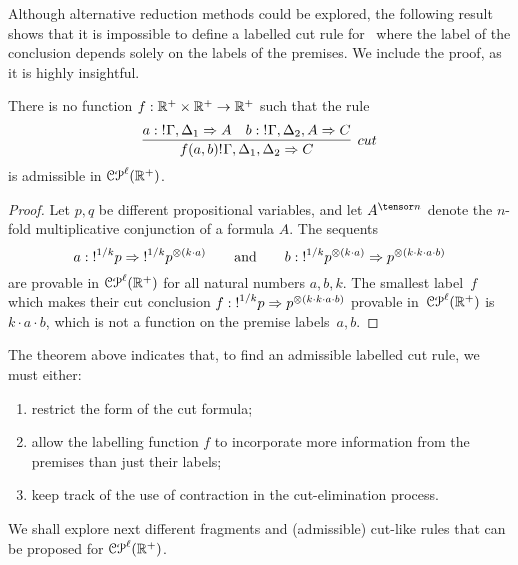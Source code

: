 Although alternative reduction methods could be explored, the following result shows that it is impossible to define a labelled cut rule for \laSELLR\ where the label of the conclusion depends solely on the labels of the premises. We include the  proof, as it is highly insightful.
\begin{theorem}\label{thm:impossible} There is no function $f:\mathbb{R}^+\times \mathbb{R}^+\rightarrow\mathbb{R}^+$ such that the rule
$$
\infer[cut]{f(a,b)\nbang{}\Gamma,\Delta_1,\Delta_2\seq C}
	{a: \nbang{}\Gamma,\Delta_1\seq A &
	b:\nbang{}\Gamma,\Delta_2,A\seq C
	}
$$
is admissible in $\mathcal{CP}^\ell(\mathbb{R}^{+})$.
\end{theorem}
\begin{proof}
Let $p,q$ be different propositional variables, and let $A^{\tensor n}$ denote the $n$-fold multiplicative conjunction of a formula $A$. The sequents
$$a:\hbox{$\mathop{!}^{1/k}$}p\Rightarrow\hbox{$\mathop{!}^{1/k}$}p^{\otimes (k\cdot a)}\qquad\text{and}\qquad b:\hbox{$\mathop{!}^{1/k}$}p^{\otimes (k\cdot a)}\Rightarrow p^{\otimes(k\cdot k\cdot a\cdot b)} 
$$
are provable in $\mathcal{CP}^\ell(\mathbb{R}^{+})$ for all natural numbers $a,b,k$. The smallest label~$f$ which makes their cut conclusion
$f: \hbox{$\mathop{!}^{1/k}$}p\Rightarrow p^{\otimes(k\cdot k\cdot a\cdot b)}
$ 
provable in~$\mathcal{CP}^\ell(\mathbb{R}^{+})$ is~$k\cdot a\cdot b$, which is not a function on the premise labels~$a,b$.
\end{proof}

\noindent

The theorem above indicates that, to find an admissible labelled cut rule, we must either:
\begin{enumerate}
\item restrict the form of the cut formula;
\item allow the labelling function $f$ to incorporate more information from the premises than just their labels;
\item keep track of the use of contraction in the cut-elimination process.
\end{enumerate}

We shall explore next
different fragments and (admissible) cut-like rules that can be proposed for $\mathcal{CP}^\ell(\mathbb{R}^{+})$.
